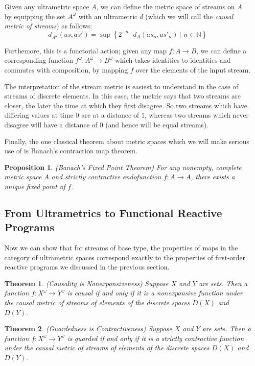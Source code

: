 \documentclass[preprint]{sigplanconf}
\newcommand{\N}{\mathbb{N}}
\newcommand{\setof}[1]{\left\{{#1}\right\}}
\newcommand{\comprehend}[2]{\setof{{#1}\;|\;{#2}}}
\newtheorem{prop}{Proposition}
\newtheorem{theorem}{Theorem}
\begin{document}
Given any ultrametric space $A$, we can define the metric space of
streams on $A$ by equipping the set $A^\omega$ with an ultrametric $d$
(which we will call the \emph{causal metric of streams}) as follows:
\begin{displaymath}
  d_{A^\omega}(as, as') = \sup \comprehend{2^{-n}\cdot d_A(as_n, as'_n)}{n \in \N}
\end{displaymath}

\noindent Furthemore, this is a functorial action; given any map $f : A \to B$, 
we can define a corresponding function $f^\omega : A^\omega \to B^\omega$ which
takes identities to identities and commutes with composition, by mapping
$f$ over the elements of the input stream.

The interpretation of the stream metric is easiest to understand in
the case of streams of discrete elements. In this case, the metric
says that two streams are closer, the later the time at which they
first disagree. So two streams which have differing values at time $0$
are at a distance of $1$, whereas two streams which never disagree
will have a distance of $0$ (and hence will be equal streams).

Finally, the one classical theorem about metric spaces which we will
make serious use of is Banach's contraction map theorem.
\begin{prop}{(Banach's Fixed Point Theorem)}
For any nonempty, complete metric space $A$ and strictly contractive
endofunction $f : A \to A$, there exists a unique fixed point of $f$.
\end{prop}

\subsection{From Ultrametrics to Functional Reactive Programs}

Now we can show that for streams of base type, the properties of maps
in the category of ultrametric spaces correspond exactly to the
properties of first-order reactive programs we discussed in the
previous section.

\begin{theorem}{(Causality is Nonexpansiveness)}
Suppose $X$ and $Y$ are sets. Then a function $f : X^\omega \to
Y^\omega$ is causal if and only if it is a nonexpansive function under
the causal metric of streams of elements of the discrete spaces $D(X)$
and $D(Y)$.
\end{theorem}

\begin{theorem}{(Guardedness is Contractiveness)}
Suppose $X$ and $Y$ are sets. Then a function $f : X^\omega \to
Y^\omega$ is guarded if and only if it is a strictly contractive
function under the causal metric of streams of elements of the
discrete spaces $D(X)$ and $D(Y)$.
\end{theorem}
\end{document}
